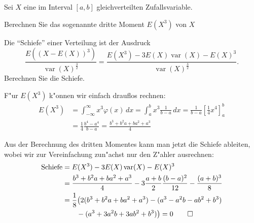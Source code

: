 Sei $X$ eine im Interval $[a,b]$ gleichverteilten Zufallsvariable.
\begin{teilaufgaben}
\item Berechnen Sie das sogenannte dritte Moment $E(X^3)$ von $X$
\item Die ``Schiefe'' einer Verteilung ist der Ausdruck
\[
\frac{E((X-E(X))^3)}{\operatorname{var}(X)^{\frac32}}
=
\frac{E(X^3)-3E(X)\operatorname{var}(X)-E(X)^3}{\operatorname{var}(X)^{\frac32}}.
\]
Berechnen Sie die Schiefe.
\end{teilaufgaben}

\begin{loesung}
\begin{teilaufgaben}
\item
F"ur $E(X^3)$ k"onnen wir einfach drauflos rechnen:
\begin{align*}
E(X^3)
&=
\int_{-\infty}^\infty x^3\varphi(x)\,dx
=
\int_a^bx^3\frac1{b-a}\,dx
=
\frac1{b-a}\left[\frac14x^4\right]_a^b
\\
&=
\frac14\frac{b^4-a^4}{b-a}
=
\frac{b^3+b^2a+ba^2+a^3}{4}
\end{align*}
\item Aus der Berechnung des dritten Momentes kann man jetzt
die Schiefe ableiten, wobei wir zur Vereinfachung zun"achst
nur den Z"ahler ausrechnen:
\begin{align*}
\text{Schiefe}
&=
E(X^3)-3E(X)\operatorname{var}(X)-E(X)^3
\\
&=
\frac{b^3+b^2a+ba^2+a^3}{4}
-3\frac{a+b}2\frac{(b-a)^2}{12}
-\frac{(a+b)^3}{8}
\\
&=
\frac18\bigl(
2(b^3+b^2a+ba^2+a^3)
-(a^3-a^2b-ab^2+b^3)
\\
&\qquad
-(a^3+3a^2b+3ab^2+b^3)
\bigr)
=0
\qedhere
\end{align*}
\end{teilaufgaben}
\end{loesung}

